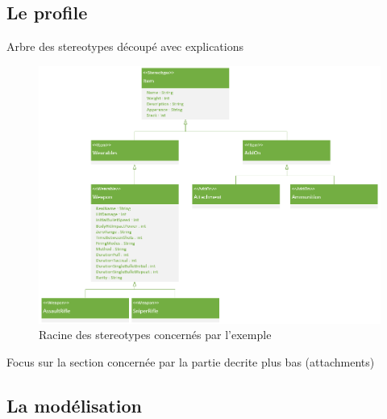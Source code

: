 \subsection{Le profile}
Arbre des stereotypes découpé avec explications
\begin{figure}[H]
    \centering
    \includegraphics[width=14cm]{10_img/chap6/root(stereotypes).PNG} 
    \caption{Racine des stereotypes concernés par l'exemple}
\end{figure}
Focus sur la section concernée par la partie decrite plus bas (attachments)



\subsection{La modélisation}

